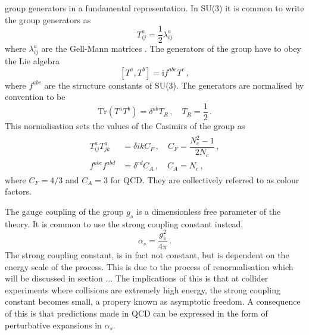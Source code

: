 \documentclass[main.tex]{subfiles}
\begin{document}
    group generators in a fundamental representation. In SU(3) it is
    common to write the group generators as
    \begin{equation}\label{eqn:group_generators}
        T^{a}_{ij} = \dfrac{1}{2}\lambda^{a}_{ij}
    \end{equation}
    where $\lambda^{a}_{ij}$ are the Gell-Mann matrices \cite{Gell-Mann:1962yej}.
    The generators of the group have to obey the Lie algebra
    \begin{equation}\label{eqn:lie_algebra}
        [T^{a}, T^{b}] = \mathrm{i}f^{abc}T^{c} \, ,
    \end{equation}
    where $f^{abc}$ are the structure constants of SU(3).
    The generators are normalised by convention to be
    \begin{equation}\label{eqn:generator_normalisation}
        \mathrm{Tr}(T^{a}T^{b}) = \delta^{ab}T_{R} \, , \quad T_{R} = \dfrac{1}{2} \, .
    \end{equation}
    This normalisation sets the values of the Casimirs
    of the group as
    \begin{align}\label{eqn:casimirs}
        \begin{split}
            T^{a}_{ij}T^{a}_{jk} &= \delta{ik}C_{F} \, , \quad C_{F} = \dfrac{N_{c}^2-1}{2N_{c}} \, , \\
            f^{abc}f^{abd} &= \delta^{cd}C_{A} \, , \quad C_{A} = N_{c} \, ,
        \end{split}
    \end{align}
    where $C_{F}=4/3$ and $C_{A}=3$ for QCD.
    They are collectively referred to as colour factors.
    
    The gauge coupling of the group $g_{s}$
    is a dimensionless free parameter of the theory.
    It is common to use the strong coupling constant
    instead, 
    \begin{equation}\label{eqn:alpha_s}
        \alpha_{s} = \dfrac{g_{s}^{2}}{4\pi} \, .
    \end{equation}
    The strong coupling constant, is in fact not constant, but
    is dependent on the energy scale of the process. This
    is due to the process of renormalisation which will be discussed
    in section ...
    The implications of this is that at collider
    experiments where collisions are extremely high energy,
    the strong coupling constant becomes small, a
    propery known as asymptotic freedom. A consequence
    of this is that predictions made in QCD can be expressed
    in the form of perturbative expansions in $\alpha_{s}$.
\end{document}

